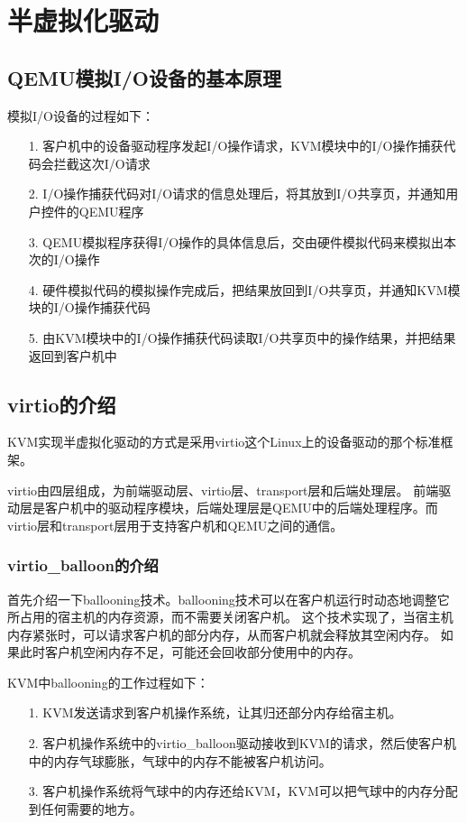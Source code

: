 \documentclass[a4paper,left=2.5cm,right=2.5cm,11pt]{article}
\begin{document}
\tableofcontents

\clearpage

\section{半虚拟化驱动}
\subsection{QEMU模拟I/O设备的基本原理}
	模拟I/O设备的过程如下：
	\begin{itemize}
		\item[1.] 客户机中的设备驱动程序发起I/O操作请求，KVM模块中的I/O操作捕获代码会拦截这次I/O请求
		\item[2.] I/O操作捕获代码对I/O请求的信息处理后，将其放到I/O共享页，并通知用户控件的QEMU程序
		\item[3.] QEMU模拟程序获得I/O操作的具体信息后，交由硬件模拟代码来模拟出本次的I/O操作
		\item[4.] 硬件模拟代码的模拟操作完成后，把结果放回到I/O共享页，并通知KVM模块的I/O操作捕获代码
		\item[5.] 由KVM模块中的I/O操作捕获代码读取I/O共享页中的操作结果，并把结果返回到客户机中
	\end{itemize}

\subsection{virtio的介绍}
	KVM实现半虚拟化驱动的方式是采用virtio这个Linux上的设备驱动的那个标准框架。\par
	virtio由四层组成，为前端驱动层、virtio层、transport层和后端处理层。
	前端驱动层是客户机中的驱动程序模块，后端处理层是QEMU中的后端处理程序。而virtio层和transport层用于支持客户机和QEMU之间的通信。\par

\subsubsection{virtio\_balloon的介绍}
	首先介绍一下ballooning技术。ballooning技术可以在客户机运行时动态地调整它所占用的宿主机的内存资源，而不需要关闭客户机。
	这个技术实现了，当宿主机内存紧张时，可以请求客户机的部分内存，从而客户机就会释放其空闲内存。
	如果此时客户机空闲内存不足，可能还会回收部分使用中的内存。\par

	KVM中ballooning的工作过程如下：
	\begin{itemize}
		\item[1.] KVM发送请求到客户机操作系统，让其归还部分内存给宿主机。
		\item[2.] 客户机操作系统中的virtio\_balloon驱动接收到KVM的请求，然后使客户机中的内存气球膨胀，气球中的内存不能被客户机访问。
		\item[3.] 客户机操作系统将气球中的内存还给KVM，KVM可以把气球中的内存分配到任何需要的地方。
	\end{itemize}
\end{document}
